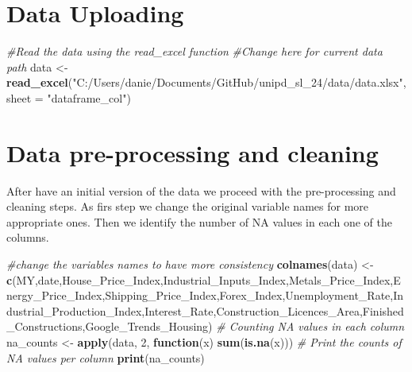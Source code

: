 \documentclass[
]{article}
\newenvironment{Shaded}{\begin{snugshade}}{\end{snugshade}}
\newcommand{\AttributeTok}[1]{\textcolor[rgb]{0.13,0.29,0.53}{#1}}
\newcommand{\CommentTok}[1]{\textcolor[rgb]{0.56,0.35,0.01}{\textit{#1}}}
\newcommand{\ControlFlowTok}[1]{\textcolor[rgb]{0.13,0.29,0.53}{\textbf{#1}}}
\newcommand{\DecValTok}[1]{\textcolor[rgb]{0.00,0.00,0.81}{#1}}
\newcommand{\FunctionTok}[1]{\textcolor[rgb]{0.13,0.29,0.53}{\textbf{#1}}}
\newcommand{\NormalTok}[1]{#1}
\newcommand{\OtherTok}[1]{\textcolor[rgb]{0.56,0.35,0.01}{#1}}
\newcommand{\StringTok}[1]{\textcolor[rgb]{0.31,0.60,0.02}{#1}}
\begin{document}
\section{Data Uploading}\label{data-uploading}

\begin{Shaded}
\begin{Highlighting}[]
\CommentTok{\#Read the data using the read\_excel function}
\CommentTok{\#Change here for current data path}
\NormalTok{data }\OtherTok{\textless{}{-}} \FunctionTok{read\_excel}\NormalTok{(}\StringTok{"C:/Users/danie/Documents/GitHub/unipd\_sl\_24/data/data.xlsx"}\NormalTok{,}\AttributeTok{sheet =} \StringTok{"dataframe\_col"}\NormalTok{)}
\end{Highlighting}
\end{Shaded}

\section{Data pre-processing and
cleaning}\label{data-pre-processing-and-cleaning}

After have an initial version of the data we proceed with the
pre-processing and cleaning steps. As firs step we change the original
variable names for more appropriate ones. Then we identify the number of
NA values in each one of the columns.

\begin{Shaded}
\begin{Highlighting}[]
\CommentTok{\#change the variables names to have more consistency }
\FunctionTok{colnames}\NormalTok{(data) }\OtherTok{\textless{}{-}} \FunctionTok{c}\NormalTok{(}\StringTok{\textquotesingle{}MY\textquotesingle{}}\NormalTok{,}\StringTok{\textquotesingle{}date\textquotesingle{}}\NormalTok{,}\StringTok{\textquotesingle{}House\_Price\_Index\textquotesingle{}}\NormalTok{,}\StringTok{\textquotesingle{}Industrial\_Inputs\_Index\textquotesingle{}}\NormalTok{,}\StringTok{\textquotesingle{}Metals\_Price\_Index\textquotesingle{}}\NormalTok{,}\StringTok{\textquotesingle{}Energy\_Price\_Index\textquotesingle{}}\NormalTok{,}\StringTok{\textquotesingle{}Shipping\_Price\_Index\textquotesingle{}}\NormalTok{,}\StringTok{\textquotesingle{}Forex\_Index\textquotesingle{}}\NormalTok{,}\StringTok{\textquotesingle{}Unemployment\_Rate\textquotesingle{}}\NormalTok{,}\StringTok{\textquotesingle{}Industrial\_Production\_Index\textquotesingle{}}\NormalTok{,}\StringTok{\textquotesingle{}Interest\_Rate\textquotesingle{}}\NormalTok{,}\StringTok{\textquotesingle{}Construction\_Licences\_Area\textquotesingle{}}\NormalTok{,}\StringTok{\textquotesingle{}Finished\_Constructions\textquotesingle{}}\NormalTok{,}\StringTok{\textquotesingle{}Google\_Trends\_Housing\textquotesingle{}}\NormalTok{) }
\CommentTok{\# Counting NA values in each column}
\NormalTok{na\_counts }\OtherTok{\textless{}{-}} \FunctionTok{apply}\NormalTok{(data, }\DecValTok{2}\NormalTok{, }\ControlFlowTok{function}\NormalTok{(x) }\FunctionTok{sum}\NormalTok{(}\FunctionTok{is.na}\NormalTok{(x)))}
\CommentTok{\# Print the counts of NA values per column}
\FunctionTok{print}\NormalTok{(na\_counts)}
\end{Highlighting}
\end{Shaded}
\end{document}
